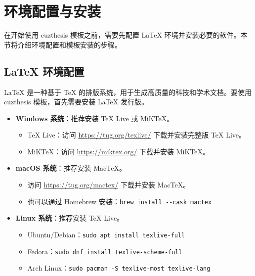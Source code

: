     \section{环境配置与安装}\label{sec:installation}

    在开始使用 cuzthesis 模板之前，需要先配置 \LaTeX{} 环境并安装必要的软件。本节将介绍环境配置和模板安装的步骤。

    \subsection{\LaTeX{} 环境配置}\label{sub:latex-environment}

    \LaTeX{} 是一种基于 \TeX{} 的排版系统，用于生成高质量的科技和学术文档。要使用 cuzthesis 模板，首先需要安装 \LaTeX{} 发行版。

    \begin{itemize}
        \item \textbf{Windows 系统}：推荐安装 TeX Live 或 MiKTeX。
            \begin{itemize}
                \item TeX Live：访问 \url{https://tug.org/texlive/} 下载并安装完整版 TeX Live。
                \item MiKTeX：访问 \url{https://miktex.org/} 下载并安装 MiKTeX。
            \end{itemize}

        \item \textbf{macOS 系统}：推荐安装 MacTeX。
            \begin{itemize}
                \item 访问 \url{https://tug.org/mactex/} 下载并安装 MacTeX。
                \item 也可以通过 Homebrew 安装：\verb|brew install --cask mactex|
            \end{itemize}

        \item \textbf{Linux 系统}：推荐安装 TeX Live。
            \begin{itemize}
                \item Ubuntu/Debian：\verb|sudo apt install texlive-full|
                \item Fedora：\verb|sudo dnf install texlive-scheme-full|
                \item Arch Linux：\verb|sudo pacman -S texlive-most texlive-lang|
            \end{itemize}
    \end{itemize}

